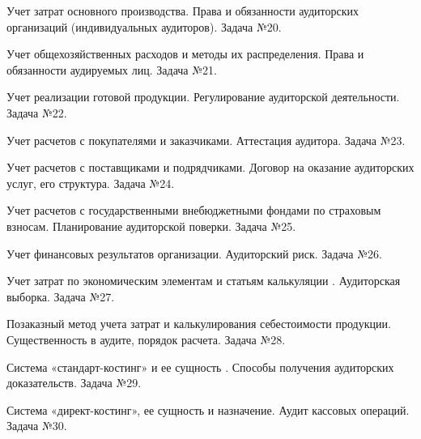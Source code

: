 \documentclass[
	11pt,
	a4paper,
	]
	{article}
\begin{document}
\noindent{} 
	{
		Учет затрат основного производства.
	}{
		Права и обязанности аудиторских организаций (индивидуальных аудиторов).
	}{
		Задача №20.
	}

\bigskip

\noindent{} 
	{
		Учет общехозяйственных расходов и методы их распределения.
	}{
		Права и обязанности аудируемых лиц.
	}{
		Задача №21.
	}

\bigskip

\noindent{} 
	{
		Учет реализации готовой продукции.
	}{
		Регулирование аудиторской деятельности.
	}{
		Задача №22.
	}

\bigskip

\noindent{} 
	{
		Учет расчетов с покупателями и заказчиками.
	}{
		Аттестация аудитора.
	}{
		Задача №23.
	}

\bigskip

\noindent{} 
	{
		Учет расчетов с поставщиками и подрядчиками.
	}{
		Договор на оказание аудиторских услуг, его структура.
	}{
		Задача №24.
	}

\bigskip

\noindent{} 
	{
		Учет расчетов с государственными внебюджетными фондами по страховым взносам.
	}{
		Планирование аудиторской поверки.
	}{
		Задача №25.
	}

\bigskip

\noindent{} 
	{
		Учет финансовых результатов организации.
	}{
		Аудиторский риск.
	}{
		Задача №26.
	}

\bigskip

\noindent{} 
	{
		Учет затрат по экономическим элементам и статьям калькуляции .
	}{
		Аудиторская выборка.
	}{
		Задача №27.
	}

\bigskip

\noindent{} 
	{
		Позаказный метод учета затрат и калькулирования себестоимости продукции.
	}{
		Существенность в аудите, порядок расчета.
	}{
		Задача №28.
	}

\bigskip

\noindent{} 
	{
		Система «стандарт-костинг» и ее сущность .
	}{
		Способы получения аудиторских доказательств.
	}{
		Задача №29.
	}

\bigskip

\noindent{} 
	{
		Система «директ-костинг», ее сущность и назначение.
	}{
		Аудит кассовых операций.
	}{
		Задача №30.
	}

\bigskip
\end{document}
